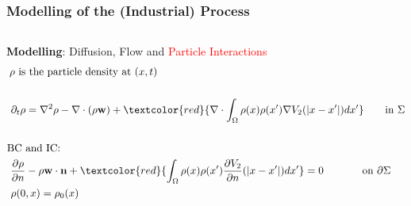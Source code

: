 \documentclass[aspectratio=169,xcolor=dvipsnames]{beamer}
\begin{document}
\begin{frame}
	\frametitle{Modelling of the (Industrial) Process}
	\begin{columns}
		\textbf{Modelling}: Diffusion, Flow and \textcolor{red}{Particle Interactions}
		\begin{align*}
		\rho \text{ is}& \text{ the particle density at } (x,t)\\
		\\
		\partial_t \rho &= \nabla^2 \rho - \nabla \cdot (\rho \mathbf{w}) +\textcolor{red}{ \nabla \cdot \int_\Omega \rho(x) \rho(x') \nabla V_2(|x-x'|)dx'} \qquad\text{in    } \Sigma\\
		\\
		\text{BC }& \text{and IC:}\\
		\frac{\partial \rho}{\partial n}& - \rho \mathbf{w} \cdot \mathbf{n} +\textcolor{red}{ \int_\Omega \rho(x) \rho(x')  \frac{ \partial  V_2}{\partial n}(|x-x'|)dx'} = 0 \quad\ \ \qquad \text{on   } \partial \Sigma   \\
		\rho(0&,x) = \rho_0(x) 
		\end{align*}
		\begin{figure}
			\includegraphics[width=3cm]{bloodcells.jpg}\\
			\includegraphics[width=3cm]{bacteria.png}\\
			\includegraphics[width=3cm]{Microfilter.png}
		\end{figure}
	\end{columns}
\end{frame}
\end{document}
